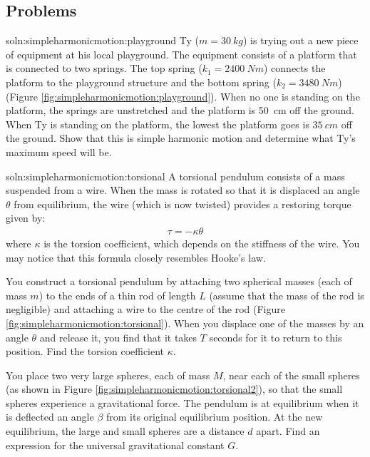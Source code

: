 \subsection{Problems}
\begin{problem}{soln:simpleharmonicmotion:playground}{\label{prob:simpleharmonicmotion:playground} Ty ($m=\SI{30}{kg}$) is trying out a new piece of equipment at his local playground. The equipment consists of a platform that is connected to two springs. The top spring ($k_1=\SI{2400}{Nm}$) connects the platform to the playground structure and the bottom spring ($k_2=\SI{3480}{Nm}$) (Figure \ref{fig:simpleharmonicmotion:playground}). When no one is standing on the platform, the springs are unstretched and the platform is \SI{50}{cm} off the ground. When Ty is standing on the platform, the lowest the platform goes is $\SI{35}{cm}$ off the ground.
Show that this is simple harmonic motion and determine what  Ty's maximum speed will be.}
\end{problem}
\begin{problemParts}{soln:simpleharmonicmotion:torsional}{
\label{prob:simpleharmonicmotion:torsional} A torsional pendulum consists of a mass suspended from a wire. When the mass is rotated so that it is displaced an angle $\theta$ from equilibrium, the wire (which is now twisted) provides a restoring torque given by:
\begin{align*}
\tau=-\kappa\theta
\end{align*}
where $\kappa$ is the torsion coefficient, which depends on the stiffness of the wire. You may notice that this formula closely resembles Hooke's law.}
\item  You construct a torsional pendulum by attaching two spherical masses (each of mass $m$) to the ends of a thin rod of length $L$ (assume that the mass of the rod is negligible) and attaching a wire to the centre of the rod (Figure \ref{fig:simpleharmonicmotion:torsional}). When you displace one of the masses by an angle $\theta$ and release it, you find that it takes $T$ seconds for it to return to this position. Find the torsion coefficient $\kappa$. 
\item You place two very large spheres, each of mass $M$, near each of the small spheres (as shown in Figure \ref{fig:simpleharmonicmotion:torsional2}), so that the small spheres experience a gravitational force. The pendulum is at equilibrium when it is deflected an angle $\beta$ from its original equilibrium position. At the new equilibrium, the large and small spheres are a distance $d$ apart. Find an expression for the universal gravitational constant $G$.
\end{problemParts}

